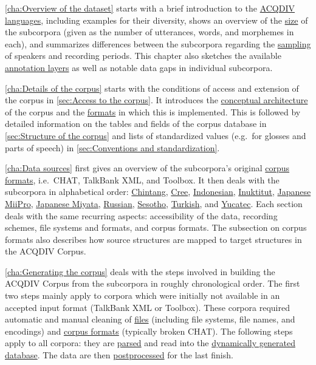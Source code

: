 \documentclass[a4paper, 11pt]{book}
\begin{document}
\autoref{cha:Overview of the dataset} starts with a brief introduction to the \hyperref[sec:The language sample]{ACQDIV languages}, including examples for their diversity, shows an overview of the \hyperref[sec:Amount of data]{size} of the subcorpora (given as the number of utterances, words, and morphemes in each), and summarizes differences between the subcorpora regarding the \hyperref[sec:Sampling for speakers and periods]{sampling} of speakers and recording periods. This chapter also sketches the available \hyperref[sec:Annotation layers and data gaps]{annotation layers} as well as notable data gaps in individual subcorpora. 

\autoref{cha:Details of the corpus} starts with the conditions of access and extension of the corpus in \autoref{sec:Access to the corpus}. It introduces the \hyperref[sec:Architecture]{conceptual architecture} of the corpus and the \hyperref[sec:Format]{formats} in which this is implemented. This is followed by detailed information on the tables and fields of the corpus database in \autoref{sec:Structure of the corpus} and lists of standardized values (e.g.\ for glosses and parts of speech) in \autoref{sec:Conventions and standardization}. 

\autoref{cha:Data sources} first gives an overview of the subcorpora's original \hyperref[sec:Corpus formats]{corpus formats}, i.e.\ CHAT, TalkBank XML, and Toolbox. It then deals with the subcorpora in alphabetical order: \hyperref[sec:Chintang]{Chintang}, \hyperref[sec:Cree]{Cree}, \hyperref[sec:Indonesian]{Indonesian}, \hyperref[sec:Inuktitut]{Inuktitut}, \hyperref[sec:Japanese MiiPro]{Japanese MiiPro}, \hyperref[sec:Japanese Miyata]{Japanese Miyata}, \hyperref[sec:Russian]{Russian}, \hyperref[sec:Sesotho]{Sesotho}, \hyperref[sec:Turkish]{Turkish}, and \hyperref[sec:Yucatec]{Yucatec}. Each section deals with the same recurring aspects: accessibility of the data, recording schemes, file systems and formats, and corpus formats. The subsection on corpus formats also describes how source structures are mapped to target structures in the ACQDIV Corpus. 

\autoref{cha:Generating the corpus} deals with the steps involved in building the ACQDIV Corpus from the subcorpora in roughly chronological order. The first two steps mainly apply to corpora which were initially not available in an accepted input format (TalkBank XML or Toolbox). These corpora required automatic and manual cleaning of \hyperref[sec:Cleaning of file formats]{files} (including file systems, file names, and encodings) and \hyperref[sec:Cleaning of corpus formats]{corpus formats} (typically broken CHAT). The following steps apply to all corpora: they are \hyperref[sec:Parsing the corpus data]{parsed} and read into the \hyperref[sec:Building the database and postprocessing]{dynamically generated database}. The data are then \hyperref[sec:Building the database and postprocessing]{postprocessed} for the last finish. 
\end{document}
